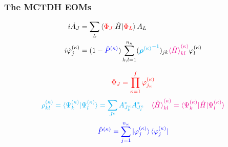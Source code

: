 \documentclass{beamer}
\begin{document}
\begin{frame}
  \frametitle{The MCTDH EOMs}
 \vspace{-.3cm}
\begin{block}{}
\begin{align}
\begin{split}
i\dot{A}_J &= \sum_L \braket{\textcolor{red}{\Phi_J}|\hat{H}|\textcolor{red}{\Phi_L}}A_L \\
i\dot{\varphi}^{(\kappa)}_j &= (1 - \textcolor{blue}{\hat{P}^{(\kappa)}})\sum_{k,l=1}^{n_{\kappa}}(\textcolor{cyan}{{\bm{\rho}^{(\kappa)}}^{-1}})_{jk}\textcolor{magenta}{\braket{\hat{H}}_{kl}^{(\kappa)}}\varphi^{(\kappa)}_l
\label{mctdh_eom}
\end{split}	
\end{align}
\end{block}
 \vspace{-.35cm}
\begin{equation}
\textcolor{red}{\Phi_J = \prod_{\kappa=1}^f\varphi_{j_{\kappa}}^{(\kappa)}}
\end{equation}
\begin{equation}
\textcolor{cyan}{\rho_{kl}^{(\kappa)} = \braket{\Psi_k^{(\kappa)}|\Psi_l^{(\kappa)}}  = \sum_{J^{\kappa}}A_{J_{k}^{\kappa}}^*A_{J_{l}^{\kappa}}^*} \quad \textcolor{magenta}{\braket{\hat{H}}_{kl}^{(\kappa)} = \braket{\Psi_k^{(\kappa)}|\hat{H}|\Psi_l^{(\kappa)}}}
\end{equation}
\begin{equation}
	\textcolor{blue}{\hat{P}^{(\kappa)} = \sum_{j=1}^{n_{\kappa}}\ket{\varphi_j^{(\kappa)}}\bra{\varphi_j^{(\kappa)}}}
\end{equation}

\end{frame}
\end{document}

